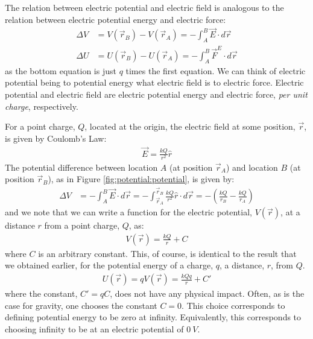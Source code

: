 The relation between electric potential and electric field is analogous to the relation between electric potential energy and electric force:
\begin{align*}
\Delta V &=V(\vec r_B)-V(\vec r_A)=-\int_A^B  \vec E\cdot d\vec r\\
\Delta U &=U(\vec r_B)-U(\vec r_A)=-\int_A^B  \vec F^E\cdot d\vec r
\end{align*}
as the bottom equation is just $q$ times the first equation. We can think of electric potential being to potential energy what electric field is to electric force. Electric potential and electric field are electric potential energy and electric force, \textit{per unit charge}, respectively.

For a point charge, $Q$, located at the origin, the electric field at some position, $\vec r$, is given by Coulomb's Law:
\begin{align*}
\vec E=\frac{kQ}{r^2}\hat r
\end{align*}
The potential difference between location $A$ (at position $\vec r_A$) and location $B$ (at position $\vec r_B$), as in Figure \ref{fig:potential:potential}, is given by:
\begin{align*}
\Delta V &=- \int_A^B  \vec E\cdot d\vec r= -\int_{\vec r_A}^{\vec r_B}  \frac{kQ}{r^2}\hat r\cdot d\vec r=-\left(\frac{kQ}{r_B}-\frac{kQ}{r_A}\right)
\end{align*}
and we note that we can write a function for the electric potential, $V(\vec r)$, at a distance $r$ from a point charge, $Q$, as:
\begin{align*}
V(\vec r)=\frac{kQ}{r}+C
\end{align*}
where $C$ is an arbitrary constant. This, of course, is identical to the result that we obtained earlier, for the potential energy of a charge, $q$, a distance, $r$, from $Q$. 
\begin{align*}
U(\vec r)=qV(\vec r)=\frac{kQq}{r}+C'
\end{align*}
where the constant, $C'=qC$, does not have any physical impact. Often, as is the case for gravity, one chooses the constant $C=0$. This choice corresponds to defining potential energy to be zero at infinity. Equivalently, this corresponds to choosing infinity to be at an electric potential of $\SI{0}{V}$.
